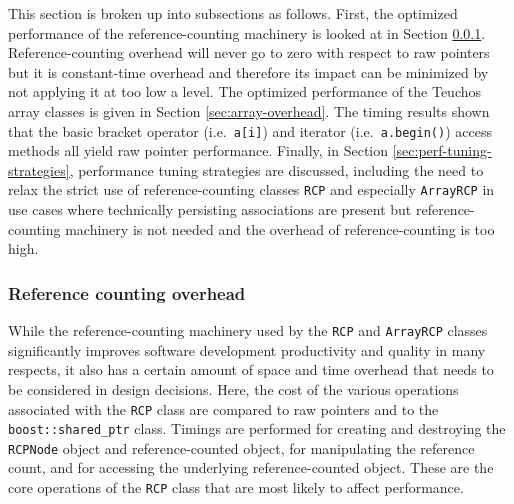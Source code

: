 \documentclass[pdf,ps2pdf,11pt]{SANDreport}
\begin{document}
This section is broken up into subsections as follows.  First, the
optimized performance of the reference-counting machinery is looked at
in Section {}\ref{sec:reference-counting-overhead}.
Reference-counting overhead will never go to zero with respect to raw
pointers but it is constant-time overhead and therefore its impact can
be minimized by not applying it at too low a level.  The optimized
performance of the Teuchos array classes is given in Section
{}\ref{sec:array-overhead}.  The timing results shown that the basic
bracket operator (i.e.\ {}\texttt{a[i]}) and iterator (i.e.\
{}\texttt{a.begin()}) access methods all yield raw pointer
performance.  Finally, in Section {}\ref{sec:perf-tuning-strategies},
performance tuning strategies are discussed, including the need to
relax the strict use of reference-counting classes {}\texttt{RCP} and
especially {}\texttt{ArrayRCP} in use cases where technically
persisting associations are present but reference-counting machinery
is not needed and the overhead of reference-counting is too high.


%
{}\subsubsection{Reference counting overhead}
\label{sec:reference-counting-overhead}
%

While the reference-counting machinery used by the {}\texttt{RCP} and
{}\texttt{ArrayRCP} classes significantly improves software
development productivity and quality in many respects, it also has a
certain amount of space and time overhead that needs to be considered
in design decisions.  Here, the cost of the various operations
associated with the {}\texttt{RCP} class are compared to raw pointers
and to the {}\texttt{boost::shared\_ptr} class.  Timings are performed
for creating and destroying the {}\texttt{RCPNode} object and
reference-counted object, for manipulating the reference count, and
for accessing the underlying reference-counted object.  These are the
core operations of the {}\texttt{RCP} class that are most likely to
affect performance.
\end{document}
